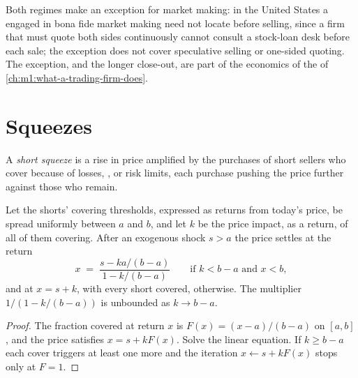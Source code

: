 Both regimes make an exception for market making: in the United States a
 engaged in bona fide market making need not locate before
selling, since a firm that must quote both sides continuously cannot consult
a stock-loan desk before each sale; the exception does not cover speculative
selling or one-sided quoting. The exception, and the longer close-out, are
part of the economics of the  of
\cref{ch:m1:what-a-trading-firm-does}.

\section{Squeezes}

\begin{definition}\label{def:m1:stock-loan-and-short-selling:squeeze}
A \emph{short squeeze} is a rise in price amplified by
the purchases of short sellers who cover because of losses, ,
 or risk limits, each purchase pushing the price further against
those who remain.
\end{definition}

\begin{proposition}\label{prop:m1:stock-loan-and-short-selling:cascade}
Let the shorts' covering thresholds, expressed as returns from today's price,
be spread uniformly between $a$ and $b$, and let $k$ be the price impact, as a
return, of all of them covering. After an exogenous shock $s > a$ the price
settles at the return
\[
x \;=\; \frac{s - ka/(b-a)}{1 - k/(b-a)} \qquad\text{if } k < b-a \text{ and } x < b,
\]
and at $x = s + k$, with every short covered, otherwise. The multiplier
$1/(1-k/(b-a))$ is unbounded as $k \to b-a$.
\end{proposition}
\begin{proof}
The fraction covered at return $x$ is $F(x) = (x-a)/(b-a)$ on $[a,b]$, and the
price satisfies $x = s + kF(x)$. Solve the linear equation. If $k \ge b-a$
each cover triggers at least one more and the iteration $x \leftarrow s +
kF(x)$ stops only at $F = 1$.
\end{proof}

